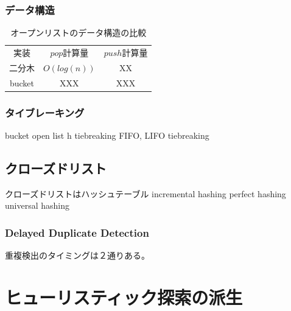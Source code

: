 \documentclass[b5paper]{report}
\begin{document}
\subsection{データ構造}
\begin{table}
\caption{オープンリストのデータ構造の比較}
\label{tbl:open-list-data-structure}
\begin{adjustbox}{width=\textwidth}
\begin{tabular}{ccc}
	実装			& $pop$計算量	& $push$計算量 \\
	二分木		& $O(log(n))$  	& XX \\
	bucket 		& XXX			& XXX \\
\end{tabular}
\end{adjustbox}
\end{table}

\subsection{タイブレーキング}
bucket open list
h tiebreaking
FIFO, LIFO tiebreaking


\section{クローズドリスト}
\label{sec:closed-list}

クローズドリストはハッシュテーブル
incremental hashing
perfect hashing
universal hashing


\subsection{Delayed Duplicate Detection}
重複検出のタイミングは２通りある。




\chapter{ヒューリスティック探索の派生}
\label{ch:heuristic-serach-variants}
\end{document}
